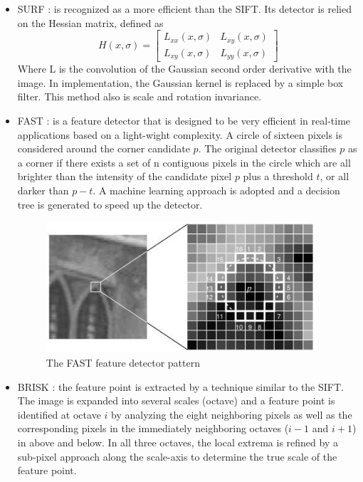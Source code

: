 \begin{itemize}
\item SURF \cite{bay2006surf}: is recognized as a more efficient than the SIFT. Its detector is relied on the Hessian matrix, defined as 
\begin{equation} \label{eq:hessian_matrix}
H(x,\sigma) = \begin{bmatrix}L_{xx}(x,\sigma) & L_{xy}(x,\sigma) \\L_{xy}(x,\sigma) & L_{yy}(x,\sigma) \end{bmatrix}
\end{equation}
Where L is the convolution of the Gaussian second order derivative with the image. In implementation, the Gaussian kernel is replaced by a simple box filter. This method also is scale and rotation invariance.
 
\item FAST \cite{rosten2010faster}: is a feature detector that is designed to be very efficient in real-time applications based on a light-wight complexity. A circle of sixteen pixels is considered around the corner candidate $p$. The original detector classifies $p$ as a corner if there exists a set of n contiguous pixels in the circle which are all brighter than the intensity of the candidate pixel $p$ plus a threshold $t$, or all darker than $p - t$. A machine learning approach is adopted and a decision tree is generated to speed up the detector. 

\begin{figure}[H]
  \centering
  \includegraphics[width=100mm]{figures/fast_detector}
  \caption{The FAST feature detector pattern}\label{fig:fast_detector}
\end{figure}

\item BRISK \cite{leutenegger2011brisk}: the feature point is extracted by a technique similar to the SIFT. The image is expanded into several scales (octave) and a feature point is identified at octave $i$ by analyzing the eight neighboring pixels as well as the corresponding pixels in the immediately neighboring octaves ($i-1$ and $i+1$) in above and below. In all three octaves, the local extrema is refined by a sub-pixel approach along the scale-axis to determine the true scale of the feature point.
\end{itemize}
